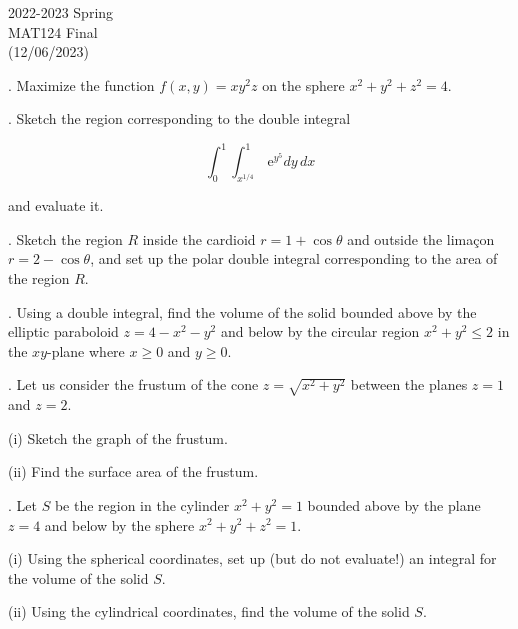 \documentclass{article}
\begin{document}
\pagestyle{empty}
\large

\begin{center}
2022-2023 Spring \\MAT124 Final\\(12/06/2023)
\end{center}

. Maximize the function $f(x,y)=xy^2z$ on the sphere $x^2+y^2+z^2 = 4$.

\hfill

. Sketch the region corresponding to the double integral

\begin{equation*}\int_0^1\int_{x^{1/4}}^1\,\mathrm{e}^{y^5}dy\,dx\end{equation*}

\hfill

\noindent and evaluate it.

\hfill

. Sketch the region $R$ inside the cardioid $r=1+\cos\theta$ and outside the limaçon $r=2-\cos\theta$, and set up the polar double integral corresponding to the area of the region $R$.

\hfill

. Using a double integral, find the volume of the solid bounded above by the elliptic paraboloid $z=4-x^2-y^2$ and below by the circular region $x^2+y^2\leq2$ in the $xy$-plane where $x\geq0$ and $y\geq0$.

\hfill

. Let us consider the frustum of the cone $z=\sqrt{x^2+y^2}$ between the planes $z=1$ and $z=2$.

\hfill

\noindent (i) Sketch the graph of the frustum.

\hfill

\noindent (ii) Find the surface area of the frustum.

\hfill

. Let $S$ be the region in the cylinder $x^2+y^2 = 1$ bounded above by the plane $z=4$ and below by the sphere $x^2+y^2+z^2=1$.

\hfill

\noindent (i) Using the spherical coordinates, set up (but do not evaluate!) an integral for the volume of the solid $S$.

\hfill

\noindent (ii) Using the cylindrical coordinates, find the volume of the solid $S$.
\end{document}
